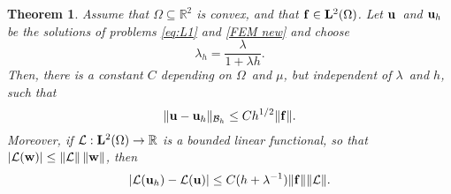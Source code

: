 \documentclass[11pt]{article}
\newcommand{\calB}{\mathcal{B}}
\newcommand{\calL}{\mathcal{L}}
\newcommand{\vf}{{\bf f}}
\newcommand{\vu}{{\bf u}}
\newcommand{\vw}{{\bf w}}
\newcommand{\R}{\mathbb{R}}
\numberwithin{equation}{section}
\newtheorem{theorem}{Theorem}[section]
\begin{document}
\begin{theorem}\label{Convergence theorem}
Assume that $\Omega\subseteq\mathbb{R}^2$ is convex, and that
$\vf \in {\bf L}^2(\Omega)$. Let $\vu$~and 
$\vu_h$ be the solutions of problems \eqref{eq:L1} and \eqref{FEM new}
and choose
\begin{equation}\label{eq: lambda_h}
\lambda_h=\frac{\lambda}{1+\lambda h}.
\end{equation}
Then, there is a constant $C$ depending on $\Omega$~and $\mu$, but independent
of $\lambda$~and $h$, such that
\[
\|\vu-\vu_h\|_{\calB_h}\le Ch^{1/2}\|\vf\|.
\]
Moreover, if $\calL:{\bf L}^2(\Omega) \to \R$ is a bounded  linear functional,
so that $|\calL(\vw)|\le \|\calL\|\,\|\vw\|$, then
\begin{equation}\label{convergence calL}
|\calL(\vu_h)-\calL(\vu)|\le C(h+\lambda^{-1})\|\vf\|\|\calL\|.
\end{equation}
\end{theorem}
\end{document}
